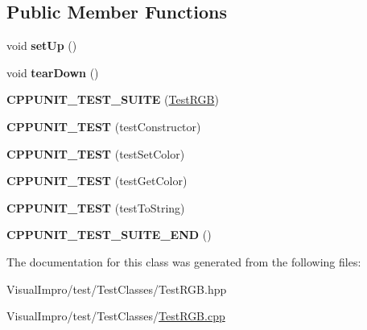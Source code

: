 \subsection*{Public Member Functions}
\begin{DoxyCompactItemize}
\item 
\mbox{\label{class_test_r_g_b_a3f14fc05a40c0771fcd03c09c6aef72f}} 
void {\bfseries set\+Up} ()
\item 
\mbox{\label{class_test_r_g_b_aac12b6a02187ba6e94e026428ec8f118}} 
void {\bfseries tear\+Down} ()
\item 
\mbox{\label{class_test_r_g_b_a3fae6b84876ac63a27359832902d4782}} 
{\bfseries C\+P\+P\+U\+N\+I\+T\+\_\+\+T\+E\+S\+T\+\_\+\+S\+U\+I\+TE} (\mbox{\hyperlink{class_test_r_g_b}{Test\+R\+GB}})
\item 
\mbox{\label{class_test_r_g_b_addedbc97d466d5ed8bc051ae5bad5030}} 
{\bfseries C\+P\+P\+U\+N\+I\+T\+\_\+\+T\+E\+ST} (test\+Constructor)
\item 
\mbox{\label{class_test_r_g_b_a039e1dd0902cc032592c0bd0bbbde716}} 
{\bfseries C\+P\+P\+U\+N\+I\+T\+\_\+\+T\+E\+ST} (test\+Set\+Color)
\item 
\mbox{\label{class_test_r_g_b_a8dea9900a328f9a7ee654a810394c3ee}} 
{\bfseries C\+P\+P\+U\+N\+I\+T\+\_\+\+T\+E\+ST} (test\+Get\+Color)
\item 
\mbox{\label{class_test_r_g_b_a16ad9705e710bdcdbfa707ac6dc8ec40}} 
{\bfseries C\+P\+P\+U\+N\+I\+T\+\_\+\+T\+E\+ST} (test\+To\+String)
\item 
\mbox{\label{class_test_r_g_b_a270d9dcddb4f46340a6c496aa18c055e}} 
{\bfseries C\+P\+P\+U\+N\+I\+T\+\_\+\+T\+E\+S\+T\+\_\+\+S\+U\+I\+T\+E\+\_\+\+E\+ND} ()
\end{DoxyCompactItemize}


The documentation for this class was generated from the following files\+:\begin{DoxyCompactItemize}
\item 
Visual\+Impro/test/\+Test\+Classes/Test\+R\+G\+B.\+hpp\item 
Visual\+Impro/test/\+Test\+Classes/\mbox{\hyperlink{_test_r_g_b_8cpp}{Test\+R\+G\+B.\+cpp}}\end{DoxyCompactItemize}
